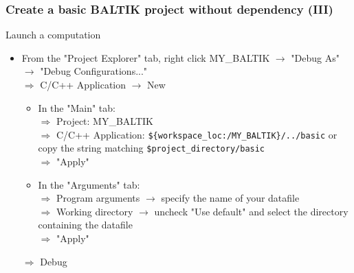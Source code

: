 \documentclass[10pt, hyperref={unicode=true,pdfusetitle, bookmarks=true,bookmarksnumbered=false,bookmarksopen=false, breaklinks=false,pdfborder={0 0 1},backref=true,colorlinks=true,linkcolor=darkblue,pageanchor, urlcolor=darkblue}]{beamer}
\begin{document}
\begin{frame}
\frametitle{Create a basic BALTIK project without dependency (III)}

\begin{exampleblock}{Launch a computation}
\begin{itemize}
\item From the "Project Explorer" tab, right click MY\_BALTIK $\rightarrow$ "Debug As" $\rightarrow$ "Debug Configurations..." \\
  $\Rightarrow$ C/C++ Application $\rightarrow$ New 
  \begin{itemize}
  \item In the "Main" tab:\\
  $\Rightarrow$ Project: MY\_BALTIK \\
  $\Rightarrow$ C/C++ Application: \texttt{\$\{workspace\_loc:/MY\_BALTIK\}/../basic} or copy the string matching \texttt{\$project\_directory/basic} \\
  $\Rightarrow$ "Apply" 
  \item In the "Arguments" tab:\\
  $\Rightarrow$ Program arguments $\rightarrow$ specify the name of your datafile \\
  $\Rightarrow$ Working directory $\rightarrow$ uncheck "Use default" and select the  directory containing the datafile \\
  $\Rightarrow$ "Apply"
  \end{itemize}
  $\Rightarrow$ Debug
\end{itemize}
\end{exampleblock}

\end{frame}
\end{document}
